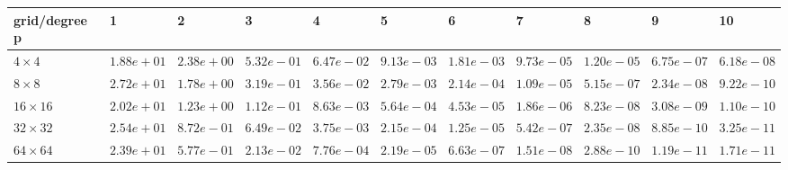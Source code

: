 \begin{tabular}{lllllllllll}
\hline
 grid/degree p   & 1          & 2          & 3          & 4          & 5          & 6          & 7          & 8          & 9          & 10         \\
\hline
 $4 \times 4$    & $1.88e+01$ & $2.38e+00$ & $5.32e-01$ & $6.47e-02$ & $9.13e-03$ & $1.81e-03$ & $9.73e-05$ & $1.20e-05$ & $6.75e-07$ & $6.18e-08$ \\
 $8 \times 8$    & $2.72e+01$ & $1.78e+00$ & $3.19e-01$ & $3.56e-02$ & $2.79e-03$ & $2.14e-04$ & $1.09e-05$ & $5.15e-07$ & $2.34e-08$ & $9.22e-10$ \\
 $16 \times 16$  & $2.02e+01$ & $1.23e+00$ & $1.12e-01$ & $8.63e-03$ & $5.64e-04$ & $4.53e-05$ & $1.86e-06$ & $8.23e-08$ & $3.08e-09$ & $1.10e-10$ \\
 $32 \times 32$  & $2.54e+01$ & $8.72e-01$ & $6.49e-02$ & $3.75e-03$ & $2.15e-04$ & $1.25e-05$ & $5.42e-07$ & $2.35e-08$ & $8.85e-10$ & $3.25e-11$ \\
 $64 \times 64$  & $2.39e+01$ & $5.77e-01$ & $2.13e-02$ & $7.76e-04$ & $2.19e-05$ & $6.63e-07$ & $1.51e-08$ & $2.88e-10$ & $1.19e-11$ & $1.71e-11$ \\
\hline
\end{tabular}